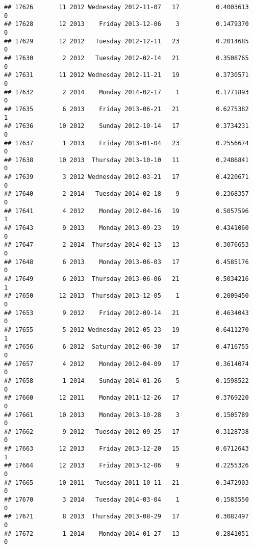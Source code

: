\documentclass[
]{article}
\begin{document}
\begin{verbatim}
## 17626       11 2012 Wednesday 2012-11-07   17          0.4003613             0
## 17628       12 2013    Friday 2013-12-06    3          0.1479370             0
## 17629       12 2012   Tuesday 2012-12-11   23          0.2014685             0
## 17630        2 2012   Tuesday 2012-02-14   21          0.3508765             0
## 17631       11 2012 Wednesday 2012-11-21   19          0.3730571             0
## 17632        2 2014    Monday 2014-02-17    1          0.1771893             0
## 17635        6 2013    Friday 2013-06-21   21          0.6275382             1
## 17636       10 2012    Sunday 2012-10-14   17          0.3734231             0
## 17637        1 2013    Friday 2013-01-04   23          0.2556674             0
## 17638       10 2013  Thursday 2013-10-10   11          0.2486841             0
## 17639        3 2012 Wednesday 2012-03-21   17          0.4220671             0
## 17640        2 2014   Tuesday 2014-02-18    9          0.2368357             0
## 17641        4 2012    Monday 2012-04-16   19          0.5057596             1
## 17643        9 2013    Monday 2013-09-23   19          0.4341060             0
## 17647        2 2014  Thursday 2014-02-13   13          0.3076653             0
## 17648        6 2013    Monday 2013-06-03   17          0.4585176             0
## 17649        6 2013  Thursday 2013-06-06   21          0.5034216             1
## 17650       12 2013  Thursday 2013-12-05    1          0.2009450             0
## 17653        9 2012    Friday 2012-09-14   21          0.4634043             0
## 17655        5 2012 Wednesday 2012-05-23   19          0.6411270             1
## 17656        6 2012  Saturday 2012-06-30   17          0.4716755             0
## 17657        4 2012    Monday 2012-04-09   17          0.3614074             0
## 17658        1 2014    Sunday 2014-01-26    5          0.1598522             0
## 17660       12 2011    Monday 2011-12-26   17          0.3769220             0
## 17661       10 2013    Monday 2013-10-28    3          0.1505789             0
## 17662        9 2012   Tuesday 2012-09-25   17          0.3128738             0
## 17663       12 2013    Friday 2013-12-20   15          0.6712643             1
## 17664       12 2013    Friday 2013-12-06    9          0.2255326             0
## 17665       10 2011   Tuesday 2011-10-11   21          0.3472903             0
## 17670        3 2014   Tuesday 2014-03-04    1          0.1583550             0
## 17671        8 2013  Thursday 2013-08-29   17          0.3082497             0
## 17672        1 2014    Monday 2014-01-27   13          0.2841051             0

\end{verbatim}
\end{document}
